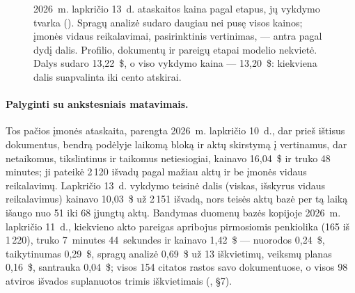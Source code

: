 \begin{figure}[H]
\centering
{}
\caption{2026~m. lapkričio 13~d. ataskaitos kaina pagal etapus, jų vykdymo tvarka
(). Spragų analizė sudaro daugiau nei pusę visos kainos; įmonės vidaus
reikalavimai, pasirinktinis vertinimas, --- antra pagal dydį dalis. Profilio, dokumentų ir
pareigų etapai modelio nekvietė. Dalys sudaro 13,22~\$, o viso vykdymo kaina --- 13,20~\$:
kiekviena dalis suapvalinta iki cento atskirai.}\label{fig:report:cost}
\end{figure}

\paragraph{Palyginti su ankstesniais matavimais.} Tos pačios įmonės ataskaita, parengta
2026~m. lapkričio 10~d., dar prieš ištisus dokumentus, bendrą podėlyje laikomą bloką ir aktų
skirstymą į vertinamus, dar netaikomus, tikslintinus ir taikomus netiesiogiai, kainavo 16,04~\$
ir truko 48 minutes; ji pateikė 2\,120 išvadų pagal mažiau aktų ir be įmonės vidaus reikalavimų.
Lapkričio 13~d. vykdymo teisinė dalis (viskas, išskyrus vidaus reikalavimus) kainavo 10,03~\$ už
2\,151 išvadą, nors teisės aktų bazė per tą laiką išaugo nuo 51 iki 68 įjungtų aktų. Bandymas
duomenų bazės kopijoje 2026~m. lapkričio 11~d., kiekvieno akto pareigas apribojus pirmosiomis
penkiolika (165 iš 1\,220), truko 7~minutes 44~sekundes ir kainavo 1,42~\$ --- nuorodos 0,24~\$,
taikytinumas 0,29~\$, spragų analizė 0,69~\$ už 13 iškvietimų, veiksmų planas 0,16~\$, santrauka
0,04~\$; visos 154 citatos rastos savo dokumentuose, o visos 98 atviros išvados suplanuotos
trimis iškvietimais (, §7).


